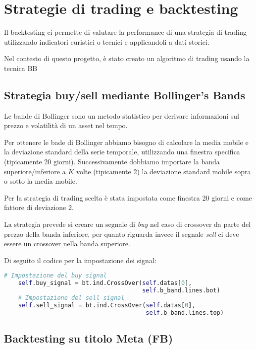 
\section{Strategie di trading e backtesting}

Il backtesting ci permette di valutare la performance di una strategia di trading utilizzando
indicatori euristici o tecnici e applicandoli a dati storici.

Nel contesto di questo progetto, è stato creato un algoritmo di trading usando la tecnica BB

\subsection{Strategia buy/sell mediante Bollinger's Bands}

Le bande di Bollinger sono un metodo statistico per derivare informazioni sul prezzo e volatilità di un asset
nel tempo.

Per ottenere le bade di Bollinger abbiamo bisogno di calcolare la media mobile e la deviazione standard della serie
temporale, utilizzando una finestra specifica (tipicamente 20 giorni). Successivamente dobbiamo importare la banda
superiore/inferiore a $K$ volte (tipicamente 2) la deviazione standard mobile sopra o sotto la media mobile.

Per la strategia di trading scelta è stata impostata come finestra 20 giorni e come fattore di deviazione $2$.

La strategia prevede si creare un segnale di \emph{buy} nel caso di crossover da parte del prezzo della banda inferiore,
per quanto riguarda invece il segnale \emph{sell} ci deve essere un crossover nella banda superiore.

Di seguito il codice per la impostazione dei signal:

\begin{lstlisting}[language=Python]
    # Impostazione del buy signal
    self.buy_signal = bt.ind.CrossOver(self.datas[0],
                                       self.b_band.lines.bot)
    # Impostazione del sell signal
    self.sell_signal = bt.ind.CrossOver(self.datas[0],
                                        self.b_band.lines.top)
\end{lstlisting}

\pagebreak

\subsection{Backtesting su titolo Meta (FB)}

